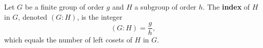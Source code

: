 Let $G$ be a finite group of order $g$ and $H$ a subgroup of order $h$. The \textbf{index} of $H$ in $G$, denoted $(G:H)$, is the integer
$$(G:H) = \frac{g}{h},$$
which equals the number of left cosets of $H$ in $G$.

